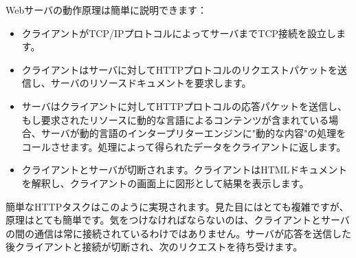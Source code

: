 Webサーバの動作原理は簡単に説明できます：

\begin{itemize}
  \item クライアントがTCP/IPプロトコルによってサーバまでTCP接続を設立します。
  \item クライアントはサーバに対してHTTPプロトコルのリクエストパケットを送信し、サーバのリソースドキュメントを要求します。
  \item サーバはクライアントに対してHTTPプロトコルの応答パケットを送信し、もし要求されたリソースに動的な言語によるコンテンツが含まれている場合、サーバが動的言語のインタープリターエンジンに"動的な内容"の処理をコールさせます。処理によって得られたデータをクライアントに返します。
  \item クライアントとサーバが切断されます。クライアントはHTMLドキュメントを解釈し、クライアントの画面上に図形として結果を表示します。
\end{itemize}


簡単なHTTPタスクはこのように実現されます。見た目にはとても複雑ですが、原理はとても簡単です。気をつけなければならないのは、クライアントとサーバの間の通信は常に接続されているわけではありません。サーバが応答を送信した後クライアントと接続が切断され、次のリクエストを待ち受けます。
